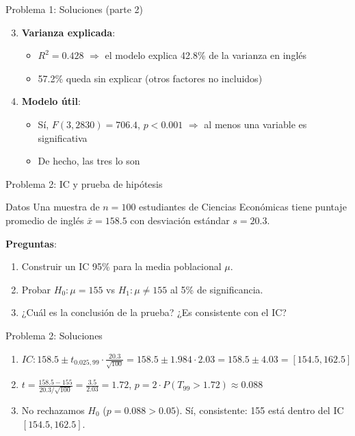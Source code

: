 \documentclass[aspectratio=169, 11pt]{beamer}
\begin{document}
\begin{frame}{Problema 1: Soluciones (parte 2)}
\begin{enumerate}
\setcounter{enumi}{2}
\item \textbf{Varianza explicada}:
  \begin{itemize}
  \item $R^2 = 0.428$ $\Rightarrow$ el modelo explica 42.8\% de la varianza en inglés
  \item 57.2\% queda sin explicar (otros factores no incluidos)
  \end{itemize}

\item \textbf{Modelo útil}:
  \begin{itemize}
  \item Sí, $F(3, 2830) = 706.4$, $p < 0.001$ $\Rightarrow$ al menos una variable es significativa
  \item De hecho, las tres lo son
  \end{itemize}
\end{enumerate}
\end{frame}

\begin{frame}{Problema 2: IC y prueba de hipótesis}
\begin{exampleblock}{Datos}
Una muestra de $n = 100$ estudiantes de Ciencias Econ\'omicas tiene puntaje promedio de inglés $\bar{x} = 158.5$ con desviación estándar $s = 20.3$.
\end{exampleblock}

\textbf{Preguntas}:
\begin{enumerate}
\item Construir un IC 95\% para la media poblacional $\mu$.
\item Probar $H_0: \mu = 155$ vs $H_1: \mu \neq 155$ al 5\% de significancia.
\item ¿Cuál es la conclusión de la prueba? ¿Es consistente con el IC?
\end{enumerate}
\end{frame}

\begin{frame}{Problema 2: Soluciones}
\begin{enumerate}
\item $IC: 158.5 \pm t_{0.025, 99} \cdot \frac{20.3}{\sqrt{100}} = 158.5 \pm 1.984 \cdot 2.03 = 158.5 \pm 4.03 = [154.5, 162.5]$

\item $t = \frac{158.5 - 155}{20.3/\sqrt{100}} = \frac{3.5}{2.03} = 1.72$, $p = 2 \cdot P(T_{99} > 1.72) \approx 0.088$

\item No rechazamos $H_0$ ($p = 0.088 > 0.05$). Sí, consistente: 155 está dentro del IC $[154.5, 162.5]$.
\end{enumerate}
\end{frame}
\end{document}
